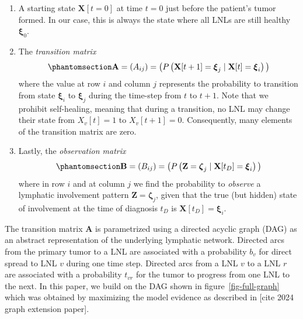 \documentclass[
  sn-mathphys-num,
]{sn-jnl}
\providecommand{\tightlist}{%
  \setlength{\itemsep}{0pt}\setlength{\parskip}{0pt}}\usepackage{longtable,booktabs,array}
\begin{document}
\begin{enumerate}
\def\labelenumi{\arabic{enumi}.}
\tightlist
\item
  A starting state \(\mathbf{X}[t=0]\) at time \(t=0\) just before the
  patient's tumor formed. In our case, this is always the state where
  all LNLs are still healthy \(\boldsymbol{\xi}_0\).
\item
  The \emph{transition matrix}
  \begin{equation}\phantomsection\label{eq-trans-matrix}{
  \mathbf{A} = \left( A_{ij} \right) = \big( P \left( \mathbf{X}[t+1] = \boldsymbol{\xi}_j \mid \mathbf{X}[t] = \boldsymbol{\xi}_i \right) \big)
  }\end{equation} where the value at row \(i\) and column \(j\)
  represents the probability to transition from state
  \(\boldsymbol{\xi}_i\) to \(\boldsymbol{\xi}_j\) during the time-step
  from \(t\) to \(t+1\). Note that we prohibit self-healing, meaning
  that during a transition, no LNL may change their state from
  \(X_v[t]=1\) to \(X_v[t+1]=0\). Consequently, many elements of the
  transition matrix are zero.
\item
  Lastly, the \emph{observation matrix}
  \begin{equation}\phantomsection\label{eq-obs-matrix}{
  \mathbf{B} = \left( B_{ij} \right) = \big( P \left( \mathbf{Z} = \boldsymbol{\zeta}_j \mid \mathbf{X}[t_D] = \boldsymbol{\xi}_i \right) \big)
  }\end{equation} where in row \(i\) and at column \(j\) we find the
  probability to \emph{observe} a lymphatic involvement pattern
  \(\mathbf{Z} = \boldsymbol{\zeta}_j\), given that the true (but
  hidden) state of involvement at the time of diagnosis \(t_D\) is
  \(\mathbf{X}[t_D] = \boldsymbol{\xi}_i\).
\end{enumerate}

The transition matrix \(\mathbf{A}\) is parametrized using a directed
acyclic graph (DAG) as an abstract representation of the underlying
lymphatic network. Directed arcs from the primary tumor to a LNL are
associated with a probability \(b_v\) for direct spread to LNL \(v\)
during one time step. Directed arcs from a LNL \(v\) to a LNL \(r\) are
associated with a probability \(t_{vr}\) for the tumor to progress from
one LNL to the next. In this paper, we build on the DAG shown in
figure~\ref{fig-full-graph} which was obtained by maximizing the model
evidence as described in {[}cite 2024 graph extension paper{]}.
\end{document}
